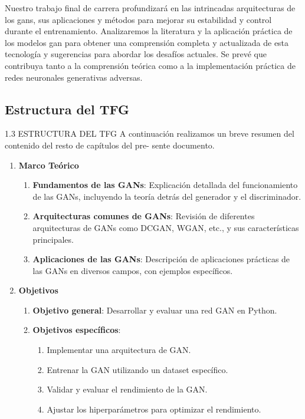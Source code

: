 Nuestro trabajo final de carrera profundizará en las intrincadas arquitecturas de los gans, sus aplicaciones y métodos para mejorar su estabilidad y control durante el entrenamiento. Analizaremos la literatura y la aplicación práctica de los modelos gan para obtener una comprensión completa y actualizada de esta tecnología y sugerencias para abordar los desafíos actuales. Se prevé que contribuya tanto a la comprensión teórica como a la implementación práctica de redes neuronales generativas adversas.
\subsection{Estructura del TFG}
1.3 ESTRUCTURA DEL TFG 
A  continuación  realizamos  un  breve  resumen  del  contenido  del  resto  de  capítulos  del  pre- sente  documento.
\begin{enumerate}[label=\textbf{\arabic*.}]

    \item \textbf{Marco Teórico}
    \begin{enumerate}[label=\textbf{\arabic*.}]
        \item \textbf{Fundamentos de las GANs}: Explicación detallada del funcionamiento de las GANs, incluyendo la teoría detrás del generador y el discriminador.
        \item \textbf{Arquitecturas comunes de GANs}: Revisión de diferentes arquitecturas de GANs como DCGAN, WGAN, etc., y sus características principales.
        \item \textbf{Aplicaciones de las GANs}: Descripción de aplicaciones prácticas de las GANs en diversos campos, con ejemplos específicos.
    \end{enumerate}

    \item \textbf{Objetivos}
    \begin{enumerate}[label=\textbf{\arabic*.}]
        \item \textbf{Objetivo general}: Desarrollar y evaluar una red GAN en Python.
        \item \textbf{Objetivos específicos}:
        \begin{enumerate}[label=\textbf{\arabic*.}]
            \item Implementar una arquitectura de GAN.
            \item Entrenar la GAN utilizando un dataset específico.
            \item Validar y evaluar el rendimiento de la GAN.
            \item Ajustar los hiperparámetros para optimizar el rendimiento.
        \end{enumerate}
    \end{enumerate}


\end{enumerate}
